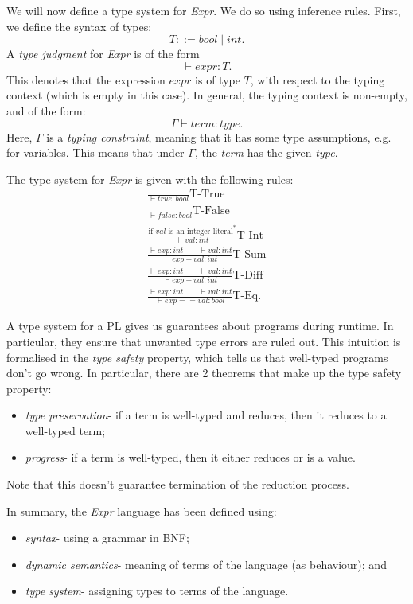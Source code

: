 \documentclass[a4paper, openany]{memoir}
\begin{document}
    We will now define a type system for \textit{Expr}. We do so using inference rules. First, we define the syntax of types:
    \[T ::= \textit{bool} \mid \textit{int}.\]
    A \emph{type judgment} for \textit{Expr} is of the form 
    \[\vdash expr \colon T.\]
    This denotes that the expression $expr$ is of type $T$, with respect to the typing context (which is empty in this case). In general, the typing context is non-empty, and of the form: 
    \[\Gamma \vdash \textit{term} \colon \textit{type}.\]
    Here, $\Gamma$ is a \emph{typing constraint}, meaning that it has some type assumptions, e.g. for variables. This means that under $\Gamma$, the \textit{term} has the given \textit{type}.

    The type system for \textit{Expr} is given with the following rules:
    \begin{align*}
        \frac{}{\vdash \textit{true} \colon \textit{bool}} \textrm{T-True} \\
        \frac{}{\vdash \textit{false} \colon \textit{bool}} \textrm{T-False} \\
        \frac{\textrm{if } val \textrm{ is an integer literal}^*}{\vdash val \colon \textit{int}} \textrm{T-Int} \\
        \frac{\vdash exp \colon \textit{int} \qquad \vdash val \colon \textit{int}}{\vdash exp + val \colon \textit{int}} \textrm{T-Sum} \\
        \frac{\vdash exp \colon \textit{int} \qquad \vdash val \colon \textit{int}}{\vdash exp - val \colon \textit{int}} \textrm{T-Diff} \\
        \frac{\vdash exp \colon \textit{int} \qquad \vdash val \colon \textit{int}}{\vdash exp == val \colon \textit{bool}} \textrm{T-Eq}.
    \end{align*}

    A type system for a PL gives us guarantees about programs during runtime. In particular, they ensure that unwanted type errors are ruled out. This intuition is formalised in the \emph{type safety} property, which tells us that well-typed programs don't go wrong. In particular, there are 2 theorems that make up the type safety property:
    \begin{itemize}
        \item \emph{type preservation}- if a term is well-typed and reduces, then it reduces to a well-typed term;
        \item \emph{progress}- if a term is well-typed, then it either reduces or is a value.
    \end{itemize}
    Note that this doesn't guarantee termination of the reduction process.

    In summary, the \textit{Expr} language has been defined using:
    \begin{itemize}
        \item \textit{syntax}- using a grammar in BNF;
        \item \textit{dynamic semantics}- meaning of terms of the language (as behaviour); and
        \item \textit{type system}- assigning types to terms of the language.
    \end{itemize}
\end{document}
